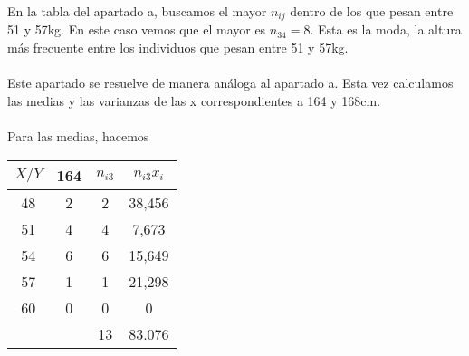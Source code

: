 \subproblem
    En la tabla del apartado a, buscamos el mayor $n_{ij}$ dentro de los que pesan entre 51 y 57kg. En este caso vemos que el mayor es $n_{34}=8$. Esta es la moda, la altura más frecuente entre los individuos que pesan entre 51 y 57kg. \\ \\
    
\subproblem
    Este apartado se resuelve de manera análoga al apartado a. Esta vez calculamos las medias y las varianzas de las x correspondientes a 164 y 168cm. \\ \\
    Para las medias, hacemos 
    \begin{center}
    \begin{tabular}{| c | c | c | c |}
        \hline
        $X / Y$ & 164 & $n_{i3}$ & $n_{i3}x_i$\\ \hline
        48 & 2 & 2 & 38,456 \\
        51 & 4 & 4 & 7,673 \\
        54 & 6 & 6 & 15,649 \\
        57 & 1 & 1 & 21,298 \\
        60 & 0 & 0 & 0 \\
        & & 13 & 83.076 \\
        \hline
    \end{tabular} \\
    \end{center}
    
